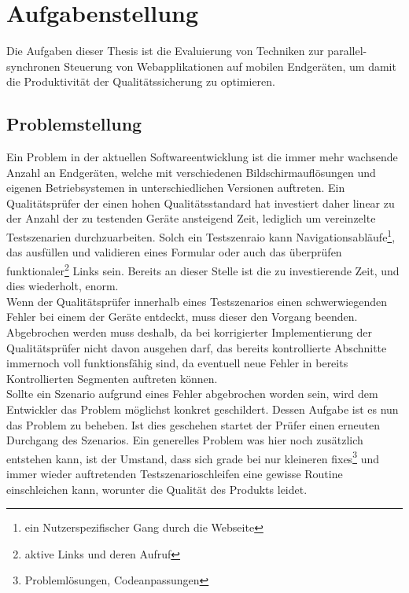 \chapter{Aufgabenstellung}
Die Aufgaben dieser Thesis ist die Evaluierung von Techniken zur parallel-synchronen Steuerung von Webapplikationen auf mobilen Endgeräten, um damit die Produktivität der Qualitätssicherung zu optimieren.
	\section{Problemstellung}
	Ein Problem in der aktuellen Softwareentwicklung ist die immer mehr wachsende Anzahl an Endgeräten, welche mit 			verschiedenen Bildschirmauflösungen und eigenen Betriebsystemen in unterschiedlichen Versionen auftreten. Ein 				Qualitätsprüfer der einen hohen Qualitätsstandard hat investiert daher linear zu der Anzahl der zu testenden Geräte ansteigend 	Zeit, lediglich um vereinzelte Testszenarien durchzuarbeiten. Solch ein Testszenraio kann Navigationsabläufe\footnote{ein 		Nutzerspezifischer Gang durch die Webseite}, das ausfüllen und validieren eines Formular oder auch das überprüfen 			funktionaler\footnote{aktive Links und deren Aufruf} Links sein. Bereits an dieser Stelle ist die zu investierende Zeit, und dies 		wiederholt, enorm.
	\\
	Wenn der Qualitätsprüfer innerhalb eines Testszenarios einen schwerwiegenden Fehler bei einem der Geräte entdeckt, muss 		dieser den Vorgang beenden. Abgebrochen werden muss deshalb, da bei korrigierter Implementierung der Qualitätsprüfer nicht 	davon ausgehen darf, das bereits kontrollierte Abschnitte immernoch voll funktionsfähig sind, da eventuell neue Fehler in bereits 	Kontrollierten Segmenten auftreten können.
	\\
	Sollte ein Szenario aufgrund eines Fehler abgebrochen worden sein, wird dem Entwickler das Problem möglichst konkret 		geschildert. Dessen Aufgabe ist es nun das Problem zu beheben. Ist dies geschehen startet der Prüfer einen erneuten 			Durchgang des Szenarios. Ein generelles Problem was hier noch zusätzlich entstehen kann, ist der Umstand, dass sich grade 		bei nur kleineren fixes\footnote{Problemlösungen, Codeanpassungen} und immer wieder auftretenden Testszenarioschleifen 		eine gewisse Routine einschleichen kann, worunter die Qualität des Produkts leidet.

